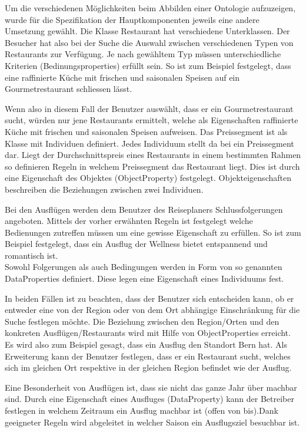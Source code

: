 Um die verschiedenen Möglichkeiten beim Abbilden einer Ontologie aufzuzeigen, wurde für die Spezifikation der Hauptkomponenten jeweils eine andere Umsetzung gewählt. Die Klasse Restaurant hat verschiedene Unterklassen. Der Besucher hat also bei der Suche die Auswahl zwischen verschiedenen Typen von Restaurants zur Verfügung. Je nach gewähltem Typ müssen unterschiedliche Kriterien (Bedinungsproperties) erfüllt sein. So ist zum Beispiel festgelegt, dass eine raffinierte Küche mit frischen und saisonalen Speisen auf ein Gourmetrestaurant schliessen lässt.

Wenn also in diesem Fall der Benutzer auswählt, dass er ein Gourmetrestaurant sucht, würden nur jene Restaurants ermittelt, welche als Eigenschaften raffinierte Küche mit frischen und saisonalen Speisen aufweisen. Das Preissegment ist als Klasse mit Individuen definiert. Jedes Individuum stellt da bei ein Preissegment dar. Liegt der Durchschnittspreis eines Restaurants in einem bestimmten Rahmen so definieren Regeln in welchem Preissegment das Restaurant liegt.  Dies ist durch eine Eigenschaft des Objektes (ObjectProperty) festgelegt. Objekteigenschaften beschreiben die Beziehungen zwischen zwei Individuen.

Bei den Ausflügen werden dem Benutzer des Reiseplaners Schlussfolgerungen angeboten. Mittels der vorher erwähnten Regeln ist festgelegt welche Bedienungen zutreffen müssen um eine gewisse Eigenschaft zu erfüllen. So ist zum Beispiel festgelegt, dass ein Ausflug der Wellness bietet entspannend und romantisch ist.\\
Sowohl Folgerungen als auch Bedingungen werden in Form von so genannten DataProperties definiert. Diese legen eine Eigenschaft eines Individuums fest.

In beiden Fällen ist zu beachten, dass der Benutzer sich entscheiden kann, ob er entweder eine von der Region oder von dem Ort abhängige Einschränkung für die Suche festlegen möchte. Die Beziehung zwischen den Region/Orten und den konkreten Ausflügen/Restaurants wird mit Hilfe von ObjectProperties erreicht. Es wird also zum Beispiel gesagt, dass ein Ausflug den Standort Bern hat. Als Erweiterung kann der Benutzer festlegen, dass er ein Restaurant sucht, welches sich im gleichen Ort respektive in der gleichen Region befindet wie der Ausflug.

Eine Besonderheit von Ausflügen ist, dass sie nicht das ganze Jahr über machbar sind. Durch eine Eigenschaft eines Ausfluges (DataProperty) kann der Betreiber festlegen in welchem Zeitraum ein Ausflug machbar ist (offen von bis).Dank geeigneter Regeln wird abgeleitet in welcher Saison ein Ausflugsziel besuchbar ist.


